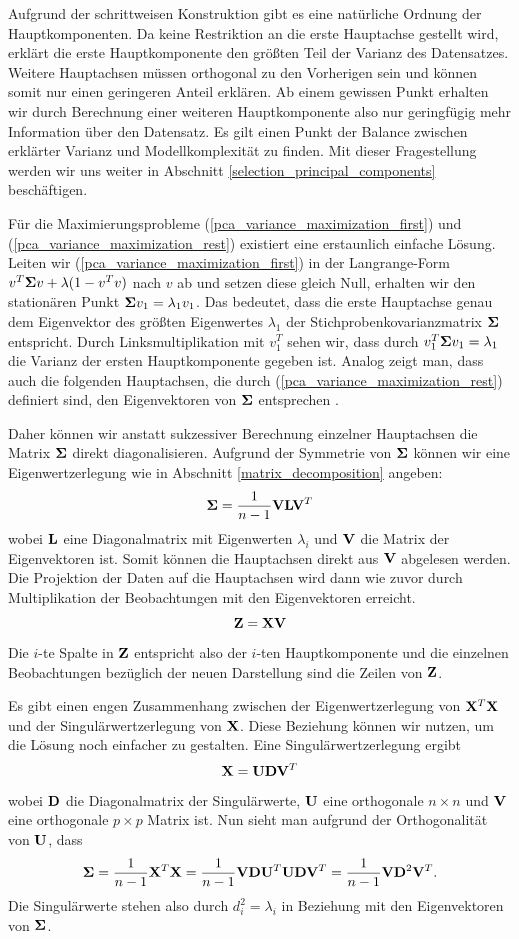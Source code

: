 Aufgrund der schrittweisen Konstruktion gibt es eine natürliche Ordnung der Hauptkomponenten. Da keine Restriktion an die erste Hauptachse gestellt wird, erklärt die erste Hauptkomponente den größten Teil der Varianz des Datensatzes. Weitere Hauptachsen müssen orthogonal zu den Vorherigen sein und können somit nur einen geringeren Anteil erklären. Ab einem gewissen Punkt erhalten wir durch Berechnung einer weiteren Hauptkomponente also nur geringfügig mehr Information über den Datensatz. Es gilt einen Punkt der Balance zwischen erklärter Varianz und Modellkomplexität zu finden. Mit dieser Fragestellung werden wir uns weiter in Abschnitt \ref{selection_principal_components} beschäftigen.

Für die Maximierungsprobleme (\ref{pca_variance_maximization_first}) und (\ref{pca_variance_maximization_rest}) existiert eine erstaunlich einfache Lösung. Leiten wir (\ref{pca_variance_maximization_first}) in der Langrange-Form $v^T\mathbf{\Sigma}v + \lambda (1-v^Tv)$ nach $v$ ab und setzen diese gleich Null, erhalten wir den stationären Punkt $\mathbf{\Sigma}v_1 = \lambda_1 v_1$. Das bedeutet, dass die erste Hauptachse genau dem Eigenvektor des größten Eigenwertes $\lambda_1$ der Stichprobenkovarianzmatrix $\mathbf{\Sigma}$ entspricht. Durch Linksmultiplikation mit $v_1^T$ sehen wir, dass durch 
$v_1^T\mathbf{\Sigma}v_1 = \lambda_1$ die Varianz der ersten Hauptkomponente  gegeben ist. Analog zeigt man, dass auch die folgenden Hauptachsen, die durch (\ref{pca_variance_maximization_rest}) definiert sind, den Eigenvektoren von $\mathbf{\Sigma}$ entsprechen \cite{bishop}.

Daher können wir anstatt sukzessiver Berechnung einzelner Hauptachsen die Matrix $\mathbf{\Sigma}$ direkt diagonalisieren. Aufgrund der Symmetrie von $\mathbf{\Sigma}$ können wir eine Eigenwertzerlegung wie in Abschnitt \ref{matrix_decomposition} angeben:
$$\mathbf{\Sigma} = \frac{1}{n-1}\mathbf{V} \mathbf{L} \mathbf{V}^T$$
wobei $\mathbf{L}$ eine Diagonalmatrix mit Eigenwerten $\lambda_i$ und $\mathbf{V}$ die Matrix der Eigenvektoren ist. Somit können die Hauptachsen direkt aus $\mathbf{V}$ abgelesen werden. Die Projektion der Daten auf die Hauptachsen wird dann wie zuvor durch Multiplikation der Beobachtungen mit den Eigenvektoren erreicht. 
$$\mathbf{Z} = \mathbf{X} \mathbf{V}$$
Die $i$-te Spalte in $\mathbf{Z}$ entspricht also der $i$-ten Hauptkomponente und die einzelnen Beobachtungen bezüglich der neuen Darstellung sind die Zeilen von $\mathbf{Z}$.

Es gibt einen engen Zusammenhang zwischen der Eigenwertzerlegung von $\mathbf{X}^T \mathbf{X}$ und der Singulärwertzerlegung von $\mathbf{X}$. Diese Beziehung können wir nutzen, um die Lösung noch einfacher zu gestalten. Eine Singulärwertzerlegung ergibt
$$\mathbf{X} = \mathbf{U}\mathbf{D}\mathbf{V}^T$$
wobei $\mathbf{D}$ die Diagonalmatrix der Singulärwerte, $\mathbf{U}$ eine orthogonale $n \times n$ und $\mathbf{V}$ eine orthogonale $p \times p$ Matrix ist. Nun sieht man aufgrund der Orthogonalität von $\mathbf{U}$, dass
$$\mathbf{\Sigma} = \frac{1}{n-1}\mathbf{X}^T \mathbf{X} = \frac{1}{n-1}\mathbf{V}\mathbf{D}\mathbf{U}^T \mathbf{U}\mathbf{D}\mathbf{V}^T = \frac{1}{n-1}\mathbf{V} \mathbf{D}^2 \mathbf{V}^T.$$
Die Singulärwerte stehen also durch $d_i^2 = \lambda_i$ in Beziehung mit den Eigenvektoren von $\mathbf{\Sigma}$. 

